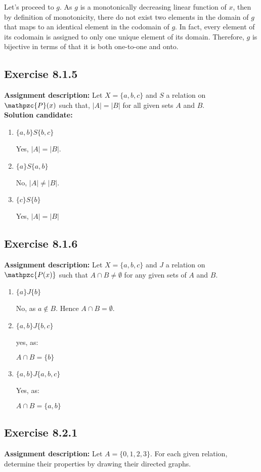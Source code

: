 \documentclass{report}
\newcommand{\cent}[1]{\begin{center}#1\end{center}}
\newcommand{\script}[1]{\mathpzc{#1}}
\newcommand{\assignmentDescription}{\textbf{Assignment description: }}
\newcommand{\solution}{\textbf{Solution candidate: }}
\newcommand{\Exercise}[1]{\subsection{Exercise #1}}
\newcommand{\defaultEnumerateLabel}{\textbf{\alph*.}}
\begin{document}
 	Let's proceed to $g$. As $g$ is a monotonically  decreasing linear function of $x$, then by definition of monotonicity, there do not exist two elements in the domain of $g$ that maps to an identical element in the codomain of $g$. In fact, every element of its codomain is assigned to only one unique element of its domain. Therefore, $g$ is bijective in terms of that it is both one-to-one and onto.
 	
 	\Exercise{8.1.5}
 	
 	\assignmentDescription
 	Let $X=\{a,b,c\}$ and $S$ a relation on $\script{P}(x)$ such that,  $|A|=|B|$ for all given sets $A$ and $B$.\\
 	
 	\solution
 	\begin{enumerate}[label=\defaultEnumerateLabel]
 		\item $\{a,b\} S \{b,c\}$
 		
 		Yes, $|A| = |B|$.
 		
 		\item $\{a\} S \{a,b\}$
 		
 		No, $|A| \neq |B| $.
 		
 		\item $\{c\} S \{b\}$
 		
 		Yes, $|A| = |B|$
 	\end{enumerate}
 	
 	\Exercise{8.1.6}
 	
 	\assignmentDescription
 	Let $X=\{a,b,c\}$ and $J$ a relation on $\script{P(x)}$ such that $A\cap B \neq \emptyset$ for any given sets of $A$ and $B$.
 	
 	\begin{enumerate}[label = \defaultEnumerateLabel]
 		\item $\{a\} J \{b\}$
 		
 		No, as $a \notin B$. Hence $A \cap B = \emptyset$. 
 		
 		\item $\{a,b\} J \{b,c\}$
 		
 		yes, as:
 		
 		\cent{$A \cap B = \{b\}$}
 		
 		\item $\{a,b\} J \{a,b,c\}$
 		
 		Yes, as:
 		
 		\cent{$A \cap B = \{a,b\}$}
 	\end{enumerate}
 	
 	\Exercise{8.2.1}
 	
 	\assignmentDescription
 	Let $A=\{0,1,2,3\}$. For each given relation, determine their properties by drawing their directed graphs.\\
 	
\end{document}
